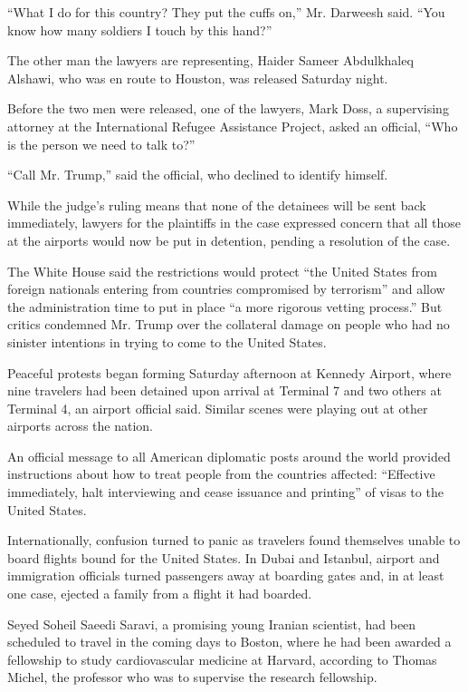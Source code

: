 ``What I do for this country? They put the cuffs on,'' Mr. Darweesh
said. ``You know how many soldiers I touch by this hand?''

The other man the lawyers are representing, Haider Sameer Abdulkhaleq
Alshawi, who was en route to Houston, was released Saturday night.

Before the two men were released, one of the lawyers, Mark Doss, a
supervising attorney at the International Refugee Assistance Project,
asked an official, ``Who is the person we need to talk to?''

``Call Mr. Trump,'' said the official, who declined to identify himself.

While the judge's ruling means that none of the detainees will be sent
back immediately, lawyers for the plaintiffs in the case expressed
concern that all those at the airports would now be put in detention,
pending a resolution of the case.

The White House said the restrictions would protect ``the United States
from foreign nationals entering from countries compromised by
terrorism'' and allow the administration time to put in place ``a more
rigorous vetting process.'' But critics condemned Mr. Trump over the
collateral damage on people who had no sinister intentions in trying to
come to the United States.

Peaceful protests began forming Saturday afternoon at Kennedy Airport,
where nine travelers had been detained upon arrival at Terminal 7 and
two others at Terminal 4, an airport official said. Similar scenes were
playing out at other airports across the nation.

An official message to all American diplomatic posts around the world
provided instructions about how to treat people from the countries
affected: ``Effective immediately, halt interviewing and cease issuance
and printing'' of visas to the United States.

Internationally, confusion turned to panic as travelers found themselves
unable to board flights bound for the United States. In Dubai and
Istanbul, airport and immigration officials turned passengers away at
boarding gates and, in at least one case, ejected a family from a flight
it had boarded.

Seyed Soheil Saeedi Saravi, a promising young Iranian scientist, had
been scheduled to travel in the coming days to Boston, where he had been
awarded a fellowship to study cardiovascular medicine at Harvard,
according to Thomas Michel, the professor who was to supervise the
research fellowship.

